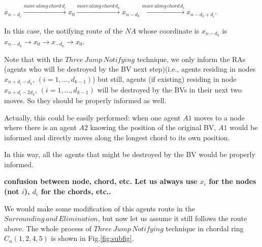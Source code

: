 $x_{n-d_i}\xrightarrow [] {move\,along\,chord\,d_i}x_0\xrightarrow [] {move\,along\,chord\,d_k}x_{n-d_k}\xrightarrow []{move\,along\,chord\,d_i}x_{n-d_k+d_i}$.
 
 In this case, the notifying route of the $NA$ whose coordinate is $x_{n-d_k}$ is $x_{n-d_k}{\rightarrow}x_0{\rightarrow}x_{-d_k}{\rightarrow}x_0$.
 
Note that with the $Three\,Jump\,Notifying$ technique, we only inform the RAs (agents who will be destroyed by the BV next step)(i.e., agents residing in nodes $x_{n+d_i-d_k}$, $(i=1,\ldots, d_{k-1})$) but still, agents (if existing) residing in node $x_{n+d_i-2d_k}$, $(i=1,\ldots, d_{k-1})$ will be destroyed by the BVs in their next two moves. So they should be properly informed as well. 

Actually, this could be easily performed: when one agent $A1$ moves to a node where there is an agent $A2$ knowing the position of the original BV, $A1$ would be informed and directly moves along the longest chord to its own position. 

In this way, all the agents that might be destroyed by the BV would be properly informed.
 
 {\bf confusion between node, chord, etc. Let us always use $x_i$ for the nodes (not $i$), $d_i$ for the chords, etc..}
 
 We would make some modification of this agents route in the $Surrounding\,and\,Elimination$, but now let us assume it still follows the route above. The whole process of  $Three\,Jump\,Notifying$ technique in chordal ring $C_n(1, 2, 4, 5)$ is shown in Fig.\ref{fig:subfig}. \\

%



